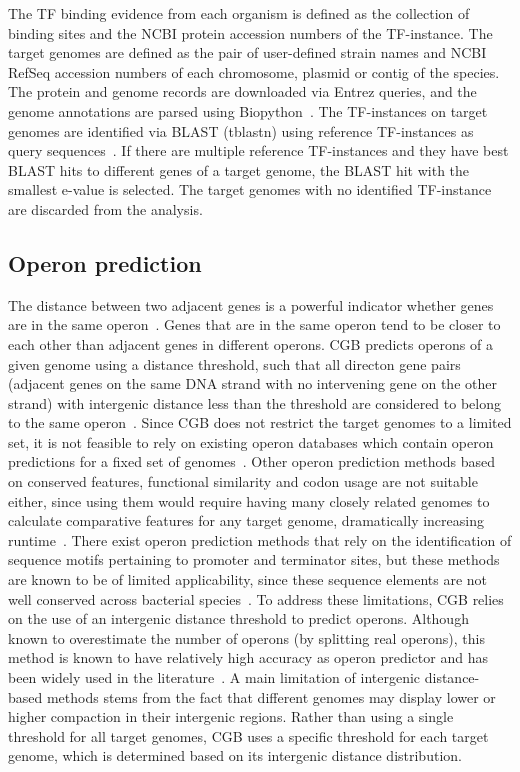 The TF binding evidence from each organism is defined as the collection of
binding sites and the NCBI protein accession numbers of the TF-instance. The
target genomes are defined as the pair of user-defined strain names and NCBI
RefSeq accession numbers of each chromosome, plasmid or contig of the
species. The protein and genome records are downloaded via Entrez queries, and
the genome annotations are parsed using Biopython~\citep{wheeler2007database,
  cock2009biopython}. The TF-instances on target genomes are identified via
BLAST (tblastn) using reference TF-instances as query
sequences~\citep{altschul1990basic}. If there are multiple reference
TF-instances and they have best BLAST hits to different genes of a target
genome, the BLAST hit with the smallest e-value is selected. The target genomes
with no identified TF-instance are discarded from the analysis.

\subsection{Operon prediction}

The distance between two adjacent genes is a powerful indicator whether genes
are in the same operon~\citep{westover2005operon}. Genes that are in the same
operon tend to be closer to each other than adjacent genes in different
operons. CGB predicts operons of a given genome using a distance threshold,
such that all directon gene pairs (adjacent genes on the same DNA strand with
no intervening gene on the other strand) with intergenic distance less than the
threshold are considered to belong to the same operon~\citep{salgado2000operons,
  moreno2002powerful, price2005novel}. Since CGB does not restrict the target
genomes to a limited set, it is not feasible to rely on existing operon
databases which contain operon predictions for a fixed set of
genomes~\citep{mao2009door, taboada2012proopdb, pertea2009operondb}. Other
operon prediction methods based on conserved features, functional similarity
and codon usage are not suitable either, since using them would require having
many closely related genomes to calculate comparative features for any target
genome, dramatically increasing runtime~\citep{chuang2012features}. There exist
operon prediction methods that rely on the identification of sequence motifs
pertaining to promoter and terminator sites, but these methods are known to be
of limited applicability, since these sequence elements are not well conserved
across bacterial species~\citep{salgado2000operons, itoh1999evolutionary}. To
address these limitations, CGB relies on the use of an intergenic distance
threshold to predict operons. Although known to overestimate the number of
operons (by splitting real operons), this method is known to have relatively
high accuracy as operon predictor and has been widely
used in the literature~\citep{chuang2012features, westover2005operon}. A main
limitation of intergenic distance-based methods stems from the fact that
different genomes may display lower or higher compaction in their intergenic
regions. Rather than using a single
threshold for all target genomes, CGB uses a specific threshold for each target
genome, which is determined based on its intergenic distance distribution.

